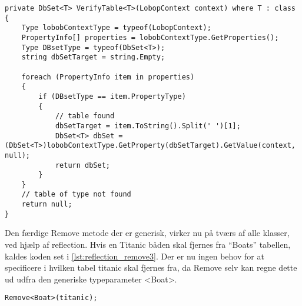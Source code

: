 \begin{lstlisting}[label=lst:reflection_verifytable]
private DbSet<T> VerifyTable<T>(LobopContext context) where T : class
{
    Type lobobContextType = typeof(LobopContext);
    PropertyInfo[] properties = lobobContextType.GetProperties();
    Type DBsetType = typeof(DbSet<T>);
    string dbSetTarget = string.Empty;

    foreach (PropertyInfo item in properties)
    {
        if (DBsetType == item.PropertyType)
        {
            // table found
            dbSetTarget = item.ToString().Split(' ')[1];
            DbSet<T> dbSet = (DbSet<T>)lobobContextType.GetProperty(dbSetTarget).GetValue(context, null);
            return dbSet;
        }
    }
    // table of type not found
    return null;
}
\end{lstlisting}

Den færdige Remove metode der er generisk, virker nu på tværs af alle klasser, ved hjælp af reflection. Hvis en Titanic båden skal fjernes fra \enquote{Boats} tabellen, kaldes koden set i \cref{lst:reflection_remove3}. Der er nu ingen behov for at specificere i hvilken tabel titanic skal fjernes fra, da Remove selv kan regne dette ud udfra den generiske typeparameter <Boat>.

\begin{lstlisting}[label=lst:reflection_remove3]
Remove<Boat>(titanic);
\end{lstlisting}
